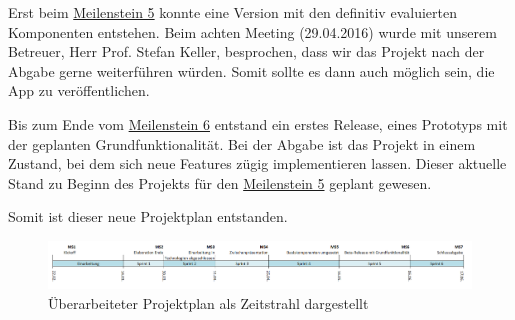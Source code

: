 Erst beim \hyperref[pm-ms5]{Meilenstein 5} konnte eine Version mit den definitiv evaluierten Komponenten entstehen. 
Beim achten Meeting (29.04.2016) wurde mit unserem Betreuer, Herr Prof. Stefan Keller, besprochen, dass wir das Projekt nach der Abgabe gerne weiterführen würden.
Somit sollte es dann auch möglich sein, die App zu veröffentlichen.

Bis zum Ende vom \hyperref[pm-ms6]{Meilenstein 6} entstand ein erstes Release, eines Prototyps mit der geplanten Grundfunktionalität. 
Bei der Abgabe ist das Projekt in einem Zustand, bei dem sich neue Features zügig implementieren lassen.
Dieser aktuelle Stand zu Beginn des Projekts für den \hyperref[pm-ms5]{Meilenstein 5} geplant gewesen.

Somit ist dieser neue Projektplan entstanden.

\begin{figure}[H]
	\centering
	\includegraphics[width=\textwidth]{images/projektmanagement/zeitstrahl_v2.png}
	\caption{Überarbeiteter Projektplan als Zeitstrahl dargestellt}
	\label{image-project-plan-timeline2}
\end{figure}




